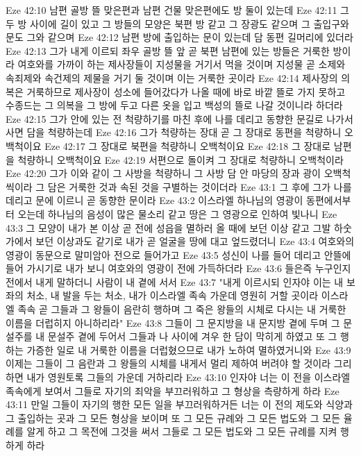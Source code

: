 Eze 42:10  남편 골방 뜰 맞은편과 남편 건물 맞은편에도 방 둘이 있는데
Eze 42:11  그 두 방 사이에 길이 있고 그 방들의 모양은 북편 방 같고 그 장광도 같으며 그 출입구와 문도 그와 같으며
Eze 42:12  남편 방에 출입하는 문이 있는데 담 동편 길머리에 있더라
Eze 42:13  그가 내게 이르되 좌우 골방 뜰 앞 곧 북편 남편에 있는 방들은 거룩한 방이라 여호와를 가까이 하는 제사장들이 지성물을 거기서 먹을 것이며 지성물 곧 소제와 속죄제와 속건제의 제물을 거기 둘 것이며 이는 거룩한 곳이라
Eze 42:14  제사장의 의복은 거룩하므로 제사장이 성소에 들어갔다가 나올 때에 바로 바깥 뜰로 가지 못하고 수종드는 그 의복을 그 방에 두고 다른 옷을 입고 백성의 뜰로 나갈 것이니라 하더라
Eze 42:15  그가 안에 있는 전 척량하기를 마친 후에 나를 데리고 동향한 문길로 나가서 사면 담을 척량하는데
Eze 42:16  그가 척량하는 장대 곧 그 장대로 동편을 척량하니 오백척이요
Eze 42:17  그 장대로 북편을 척량하니 오백척이요
Eze 42:18  그 장대로 남편을 척량하니 오백척이요
Eze 42:19  서편으로 돌이켜 그 장대로 척량하니 오백척이라
Eze 42:20  그가 이와 같이 그 사방을 척량하니 그 사방 담 안 마당의 장과 광이 오백척씩이라 그 담은 거룩한 것과 속된 것을 구별하는 것이더라
Eze 43:1  그 후에 그가 나를 데리고 문에 이르니 곧 동향한 문이라
Eze 43:2  이스라엘 하나님의 영광이 동편에서부터 오는데 하나님의 음성이 많은 물소리 같고 땅은 그 영광으로 인하여 빛나니
Eze 43:3  그 모양이 내가 본 이상 곧 전에 성읍을 멸하러 올 때에 보던 이상 같고 그발 하숫가에서 보던 이상과도 같기로 내가 곧 얼굴을 땅에 대고 엎드렸더니
Eze 43:4  여호와의 영광이 동문으로 말미암아 전으로 들어가고
Eze 43:5  성신이 나를 들어 데리고 안뜰에 들어 가시기로 내가 보니 여호와의 영광이 전에 가득하더라
Eze 43:6  들은즉 누구인지 전에서 내게 말하더니 사람이 내 곁에 서서
Eze 43:7  "내게 이르시되 인자야 이는 내 보좌의 처소, 내 발을 두는 처소, 내가 이스라엘 족속 가운데 영원히 거할 곳이라 이스라엘 족속 곧 그들과 그 왕들이 음란히 행하며 그 죽은 왕들의 시체로 다시는 내 거룩한 이름을 더럽히지 아니하리라"
Eze 43:8  그들이 그 문지방을 내 문지방 곁에 두며 그 문설주를 내 문설주 곁에 두어서 그들과 나 사이에 겨우 한 담이 막히게 하였고 또 그 행하는 가증한 일로 내 거룩한 이름을 더럽혔으므로 내가 노하여 멸하였거니와
Eze 43:9  이제는 그들이 그 음란과 그 왕들의 시체를 내게서 멀리 제하여 버려야 할 것이라 그리하면 내가 영원토록 그들의 가운데 거하리라
Eze 43:10  인자야 너는 이 전을 이스라엘 족속에게 보여서 그들로 자기의 죄악을 부끄러워하고 그 형상을 측량하게 하라
Eze 43:11  만일 그들이 자기의 행한 모든 일을 부끄러워하거든 너는 이 전의 제도와 식양과 그 출입하는 곳과 그 모든 형상을 보이며 또 그 모든 규례와 그 모든 법도와 그 모든 율례를 알게 하고 그 목전에 그것을 써서 그들로 그 모든 법도와 그 모든 규례를 지켜 행하게 하라
